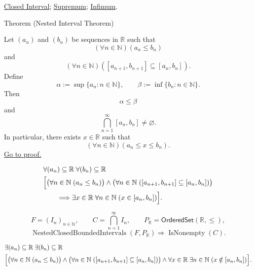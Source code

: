 \begin{dependencies}
\hyperref[def:closed-interval]{Closed Interval};
\hyperref[def:supremum]{Supremum};
\hyperref[def:infimum]{Infimum}.
\end{dependencies}



\begin{theorembox}{Theorem (Nested Interval Theorem)}
\begin{theorem}
\label{thm:nested-interval-theorem}
Let $(a_n)$ and $(b_n)$ be sequences in $\mathbb{R}$ such that
\[
  (\forall n\in\mathbb{N})(a_n\leq b_n)
\]
and
\[
  (\forall n\in\mathbb{N})([a_{n+1},b_{n+1}]\subseteq [a_n,b_n]).
\]
Define
\[
  \alpha:=\sup\{a_n:n\in\mathbb{N}\},
  \qquad
  \beta:=\inf\{b_n:n\in\mathbb{N}\}.
\]
Then
\[
  \alpha\leq\beta
\]
and
\[
  \bigcap_{n=1}^{\infty}[a_n,b_n]\neq\varnothing.
\]
In particular, there exists $x\in\mathbb{R}$ such that
\[
  (\forall n\in\mathbb{N})(a_n\leq x\leq b_n).
\]
\hyperref[prf:nested-interval-theorem]{Go to proof.}
\end{theorem}
\end{theorembox}

\begin{remark*}
\[
\begin{aligned}
&\forall (a_n)\subseteq\mathbb{R}\;\forall (b_n)\subseteq\mathbb{R}\;\\
&\Bigl[
\bigl(\forall n\in\mathbb{N}\;(a_n\le b_n)\bigr)
\land
\bigl(\forall n\in\mathbb{N}\;([a_{n+1},b_{n+1}]\subseteq [a_n,b_n])\bigr)
\\
&\qquad\Longrightarrow
\exists x\in\mathbb{R}\;\forall n\in\mathbb{N}\;(x\in [a_n,b_n])
\Bigr].
\end{aligned}
\]
\end{remark*}

\begin{remark*}
\[
F=(I_n)_{n\in\mathbb{N}},\qquad C=\bigcap_{n=1}^{\infty}I_n,\qquad
P_{\mathbb{R}}=\mathsf{OrderedSet}(\mathbb{R},\leq),
\]
\[
\operatorname{NestedClosedBoundedIntervals}(F,P_{\mathbb{R}})\Longrightarrow
\operatorname{IsNonempty}(C).
\]
\end{remark*}

\begin{remark*}
\[
\begin{aligned}
&\exists (a_n)\subseteq\mathbb{R}\;\exists (b_n)\subseteq\mathbb{R}\;\\
&\Bigl[
\bigl(\forall n\in\mathbb{N}\;(a_n\le b_n)\bigr)
\land
\bigl(\forall n\in\mathbb{N}\;([a_{n+1},b_{n+1}]\subseteq [a_n,b_n])\bigr)
\land
\forall x\in\mathbb{R}\;\exists n\in\mathbb{N}\;(x\notin [a_n,b_n])
\Bigr].
\end{aligned}
\]
\end{remark*}

